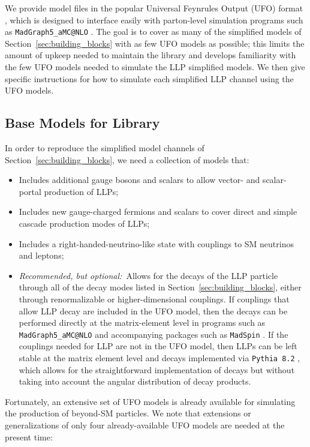 We provide model files in the popular Universal Feynrules Output (UFO) format \cite{Degrande:2011ua}, which is designed to interface easily with parton-level simulation programs such as \texttt{MadGraph5\_aMC@}\texttt{NLO} \cite{Alwall:2014hca}. The goal is to cover as many of the simplified models of Section~\ref{sec:building_blocks} with as few UFO models as possible; this limits the amount of upkeep needed to maintain the library and develops familiarity with the few UFO models needed to simulate the LLP simplified models. We then give specific instructions for how to simulate each simplified LLP channel using the UFO models. 

\subsection{Base Models for Library}\label{sec:base}

In order to reproduce the simplified model channels of Section~\ref{sec:building_blocks}, we need a collection of models that:
%
\begin{itemize}
\item Includes additional gauge bosons and scalars to allow vector- and scalar-portal production of LLPs;
\item Includes new gauge-charged fermions and scalars to cover direct and simple cascade production modes of LLPs;
\item Includes a right-handed-neutrino-like state with couplings to SM neutrinos and leptons;
\item \emph{Recommended, but optional:}~Allows for the decays of the LLP particle through all of the decay modes listed in Section~\ref{sec:building_blocks}, either through renormalizable or higher-dimensional couplings. If couplings that allow LLP decay are included in the UFO model, then the decays can be performed directly at the matrix-element level in programs such as \texttt{MadGraph5\_aMC@}\texttt{NLO} \cite{Alwall:2014hca} and accompanying packages such as \texttt{MadSpin} \cite{Artoisenet:2012st}. If the couplings needed for LLP are not in the UFO model, then LLPs can be left stable at the matrix element level and decays implemented via \texttt{Pythia 8.2} \cite{Sjostrand:2007gs,Sjostrand:2014zea}, which allows for the straightforward implementation of decays but without taking into account the angular distribution of decay products.
\end{itemize}

Fortunately, an extensive set of UFO models is already available for simulating the production of beyond-SM particles. We note that extensions or generalizations of only four already-available UFO models are needed at the present time:

